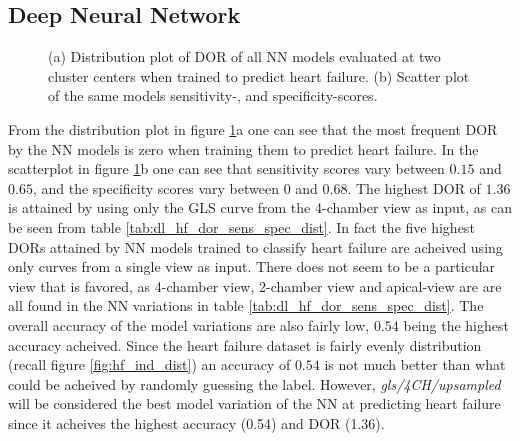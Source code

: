 \newpage 

\subsection{Deep Neural Network}

\begin{figure}[htb]
    \centering
    
    \caption{(a) Distribution plot of DOR of all NN models evaluated at two cluster centers when trained to predict heart failure.
             (b) Scatter plot of the same models sensitivity-, and specificity-scores.}
    \label{fig:dl_hf_dor_sens_spec_dist}
\end{figure}

From the distribution plot in figure \ref{fig:dl_hf_dor_sens_spec_dist}a one can see that the most frequent DOR by the NN models is zero when training them to predict heart failure.
In the scatterplot in figure \ref{fig:dl_hf_dor_sens_spec_dist}b one can see that sensitivity scores vary between $0.15$ and $0.65$, and the specificity scores vary between $0$ and $0.68$.
The highest DOR of $1.36$ is attained by using only the GLS curve from the 4-chamber view as input, as can be seen from table \ref{tab:dl_hf_dor_sens_spec_dist}.
In fact the five highest DORs attained by NN models trained to classify heart failure are acheived using only curves from a single view as input.
There does not seem to be a particular view that is favored, as 4-chamber view, 2-chamber view and apical-view are are all found in the NN variations in table \ref{tab:dl_hf_dor_sens_spec_dist}.
The overall accuracy of the model variations are also fairly low, $0.54$ being the highest accuracy acheived.
Since the heart failure dataset is fairly evenly distribution (recall figure \ref{fig:hf_ind_dist}) an accuracy of $0.54$ is not much better than what could be acheived 
by randomly guessing the label. 
However, \textit{gls/4CH/upsampled} will be considered the best model variation of the NN at predicting heart failure since it acheives the highest accuracy (0.54) and DOR (1.36). \bigskip

